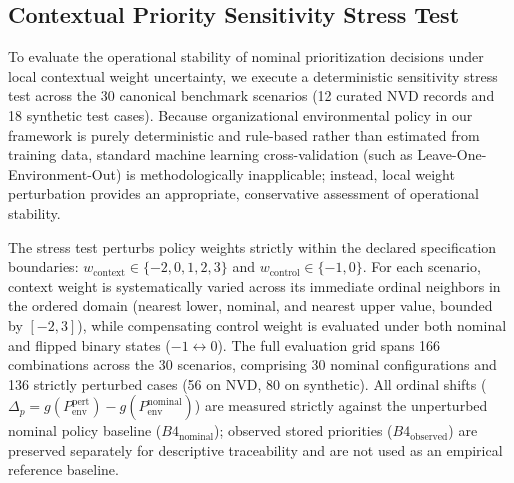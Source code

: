\documentclass[conference]{IEEEtran}
\begin{document}
\subsection{Contextual Priority Sensitivity Stress Test}

To evaluate the operational stability of nominal prioritization decisions under local contextual weight uncertainty, we execute a deterministic sensitivity stress test across the 30 canonical benchmark scenarios (12 curated NVD records and 18 synthetic test cases). Because organizational environmental policy in our framework is purely deterministic and rule-based rather than estimated from training data, standard machine learning cross-validation (such as Leave-One-Environment-Out) is methodologically inapplicable; instead, local weight perturbation provides an appropriate, conservative assessment of operational stability.

The stress test perturbs policy weights strictly within the declared specification boundaries: $w_{\text{context}} \in \{-2, 0, 1, 2, 3\}$ and $w_{\text{control}} \in \{-1, 0\}$. For each scenario, context weight is systematically varied across its immediate ordinal neighbors in the ordered domain (nearest lower, nominal, and nearest upper value, bounded by $[-2, 3]$), while compensating control weight is evaluated under both nominal and flipped binary states ($-1 \leftrightarrow 0$). The full evaluation grid spans 166 combinations across the 30 scenarios, comprising 30 nominal configurations and 136 strictly perturbed cases (56 on NVD, 80 on synthetic). All ordinal shifts ($\Delta_p = g(P_{\text{env}}^{\text{pert}}) - g(P_{\text{env}}^{\text{nominal}})$) are measured strictly against the unperturbed nominal policy baseline ($B4_{\text{nominal}}$); observed stored priorities ($B4_{\text{observed}}$) are preserved separately for descriptive traceability and are not used as an empirical reference baseline.
\end{document}

